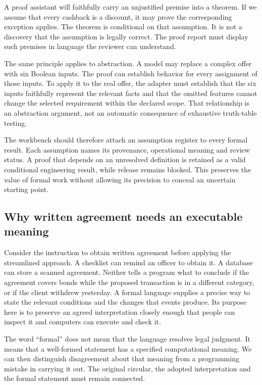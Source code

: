 \documentclass[12pt,a4paper,oneside,openany]{book}
\begin{document}
A proof assistant will faithfully carry an unjustified premise into a theorem.
If we assume that every cashback is a discount, it may prove the corresponding
exception applies. The theorem is conditional on that assumption. It is not a
discovery that the assumption is legally correct. The proof report must display
such premises in language the reviewer can understand.

The same principle applies to abstraction. A model may replace a complex offer
with six Boolean inputs. The proof can establish behavior for every assignment
of those inputs. To apply it to the real offer, the adapter must establish that
the six inputs faithfully represent the relevant facts and that the omitted
features cannot change the selected requirement within the declared scope.
That relationship is an abstraction argument, not an automatic consequence of
exhaustive truth-table testing.

The workbench should therefore attach an assumption register to every formal
result. Each assumption names its provenance, operational meaning and review
status. A proof that depends on an unresolved definition is retained as a valid
conditional engineering result, while release remains blocked. This preserves
the value of formal work without allowing its precision to conceal an uncertain
starting point.

\subsection{Why written agreement needs an executable meaning}
\label{merge:P-01a-language-lesson:00}

\label{sec:language-lesson}

Consider the instruction to obtain written agreement before applying the
streamlined approach. A checklist can remind an officer to obtain it. A database
can store a scanned agreement. Neither tells a program what to conclude if the
agreement covers bonds while the proposed transaction is in a different category,
or if the client withdrew yesterday. A formal language supplies a precise way
to state the relevant conditions and the changes that events produce. Its
purpose here is to preserve an agreed interpretation closely enough that people
can inspect it and computers can execute and check it.

The word ``formal'' does not mean that the language resolves legal judgment.
It means that a well-formed statement has a specified computational meaning.
We can then distinguish disagreement about that meaning from a programming
mistake in carrying it out. The original circular, the adopted interpretation
and the formal statement must remain connected.
\end{document}
